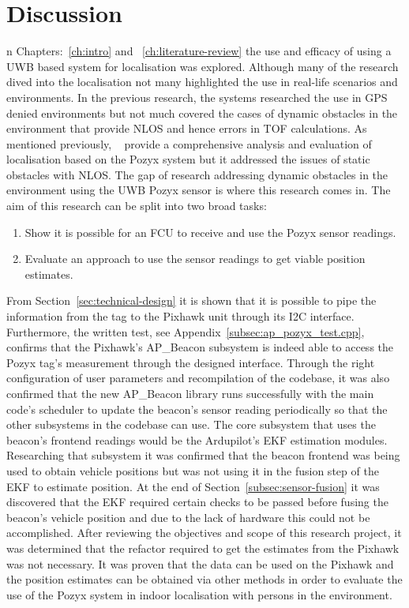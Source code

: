 \chapter{Discussion}\label{ch:discussion}
n Chapters:~\ref{ch:intro} and ~\ref{ch:literature-review} the use and efficacy of using a UWB based system for localisation was explored.
Although many of the research dived into the localisation not many highlighted the use in real-life scenarios and environments.
In the previous research, the systems researched the use in GPS denied environments but not much covered the cases of dynamic obstacles in the environment that provide NLOS and hence errors in TOF calculations.
As mentioned previously, ~\citet{evaluwb} provide a comprehensive analysis and evaluation of localisation based on the Pozyx system but it addressed the issues of static obstacles with NLOS.
The gap of research addressing dynamic obstacles in the environment using the UWB Pozyx sensor is where this research comes in.
The aim of this research can be split into two broad tasks:
\begin{enumerate}
    \item Show it is possible for an FCU to receive and use the Pozyx sensor readings.
    \item Evaluate an approach to use the sensor readings to get viable position estimates.
\end{enumerate}

From Section~\ref{sec:technical-design} it is shown that it is possible to pipe the information from the tag to the Pixhawk unit through its I2C interface.
Furthermore, the written test, see Appendix~\ref{subsec:ap_pozyx_test.cpp}, confirms that the Pixhawk's AP\_Beacon subsystem is indeed able to access the Pozyx tag's measurement through the designed interface.
Through the right configuration of user parameters and recompilation of the codebase, it was also confirmed that the new AP\_Beacon library runs successfully with the main code's scheduler to update the beacon's sensor reading periodically so that the other subsystems in the codebase can use.
The core subsystem that uses the beacon's frontend readings would be the Ardupilot's EKF estimation modules.
Researching that subsystem it was confirmed that the beacon frontend was being used to obtain vehicle positions but was not using it in the fusion step of the EKF to estimate position.
At the end of Section~\ref{subsec:sensor-fusion} it was discovered that the EKF required certain checks to be passed before fusing the beacon's  vehicle position and due to the lack of hardware this could not be accomplished.
After reviewing the objectives and scope of this research project, it was determined that the refactor required to get the estimates from the Pixhawk was not necessary.
It was proven that the data can be used on the Pixhawk and the position estimates can be obtained via other methods in order to evaluate the use of the Pozyx system in indoor localisation with persons in the environment.

